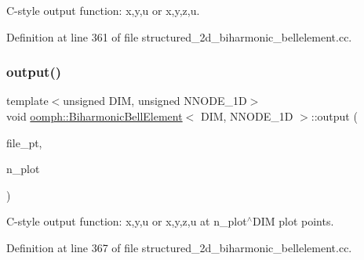C-\/style output function\+: x,y,u or x,y,z,u. 



Definition at line 361 of file structured\+\_\+2d\+\_\+biharmonic\+\_\+bellelement.\+cc.

\mbox{\label{classoomph_1_1BiharmonicBellElement_af7003f7a520fd41ecd5226b247b53778}} 
\subsubsection{\texorpdfstring{output()}{output()}\hspace{0.1cm}{\footnotesize\ttfamily [4/4]}}
{\footnotesize\ttfamily template$<$unsigned D\+IM, unsigned N\+N\+O\+D\+E\+\_\+1D$>$ \\
void \hyperlink{classoomph_1_1BiharmonicBellElement}{oomph\+::\+Biharmonic\+Bell\+Element}$<$ D\+IM, N\+N\+O\+D\+E\+\_\+1D $>$\+::output (\begin{DoxyParamCaption}\item[{F\+I\+LE $\ast$}]{file\+\_\+pt,  }\item[{const unsigned \&}]{n\+\_\+plot }\end{DoxyParamCaption})\hspace{0.3cm}{\ttfamily [inline]}}



C-\/style output function\+: x,y,u or x,y,z,u at n\+\_\+plot$^\wedge$\+D\+IM plot points. 



Definition at line 367 of file structured\+\_\+2d\+\_\+biharmonic\+\_\+bellelement.\+cc.

\mbox{\label{classoomph_1_1BiharmonicBellElement_a20e53aaa3168901f8ede66827e6d6a00}} 
